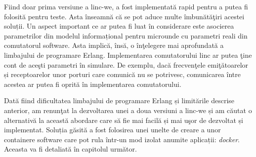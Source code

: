 Fiind doar prima versiune a \gls{linc-we}, a fost implementată rapid pentru a putea fi folosită pentru teste. Asta înseamnă că se pot aduce multe îmbunătăţiri acestei soluții. Un aspect important ce ar putea fi luat în considerare este asocierea parametrilor din modelul informațional pentru microunde cu parametri reali din comutatorul software. Asta implică, însă, o înţelegere mai aprofundată a limbajului de programare Erlang. Implementarea comutatorului \gls{linc} ar putea ţine cont de aceşti parametri în simulare. De exemplu, dacă frecvenţele emiţătoarelor și receptoarelor unor porturi care comunică nu se potrivesc, comunicarea între acestea ar putea fi oprită în implementarea comutatorului.

Dată fiind dificultatea limbajului de programare Erlang și limitările descrise anterior, am renunţat la dezvoltarea unei a doua versiuni a \gls{linc-we} și am căutat o alternativă la această abordare care să fie mai facilă și mai uşor de dezvoltat și implementat. Soluția găsită a fost folosirea unei unelte de creare a unor containere software care pot rula într-un mod izolat anumite aplicații: \textit{docker}. Aceasta va fi detaliată în capitolul următor.